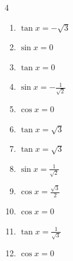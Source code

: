 \begin{multicols}{4}
\begin{enumerate}
  \item $\displaystyle \tan{x}  = -\sqrt{3}$


  \item $\displaystyle \sin{x}  = 0$


  \item $\displaystyle \tan{x}  = 0$


  \item $\displaystyle \sin{x}  = -\frac{1}{\sqrt{2}}$


  \item $\displaystyle \cos{x}  = 0$


  \item $\displaystyle \tan{x}  = \sqrt{3}$


  \item $\displaystyle \tan{x}  = \sqrt{3}$


  \item $\displaystyle \sin{x}  = \frac{1}{\sqrt{2}}$


  \item $\displaystyle \cos{x}  = \frac{\sqrt{3}}{2}$


  \item $\displaystyle \cos{x}  = 0$


  \item $\displaystyle \tan{x}  = \frac{1}{\sqrt{3}}$


  \item $\displaystyle \cos{x}  = 0$


\end{enumerate}
\end{multicols}
